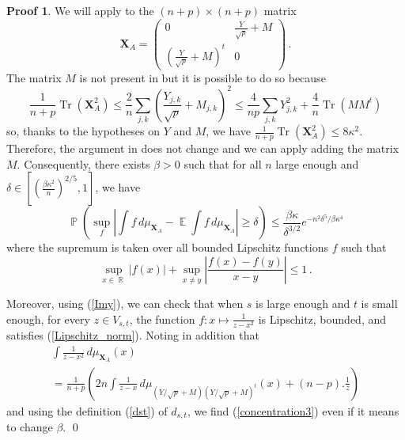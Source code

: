 \documentclass[11pt,a4paper]{article}
\DeclareMathOperator{\E}{\mathbb{E}}
\DeclareMathOperator{\R}{\mathbb{R}}
\DeclareMathOperator{\PR}{\mathbb{P}}
\DeclareMathOperator{\1}{\mathbf{1}}
\DeclareMathOperator{\Tr}{\mathrm{Tr}}
\theoremstyle{definition}
\newtheorem*{Proof}{Proof}
\begin{document}
\begin{Proof}
We will apply \cite[Theorem 1.3(b)]{GZ} to the $(n+p) \times (n+p)$ matrix
\begin{displaymath}
\mathbf{X}_A = \left( \begin{array}{c|c} 0 & \frac{Y}{\sqrt{p}} + M \\ \hline \left( \frac{Y}{\sqrt{p}} + M \right)^t & 0 \end{array} \right) \, .
\end{displaymath}
The matrix $M$ is not present in \cite{GZ} but it is possible to do so because
\begin{displaymath}
\frac{1}{n+p} \Tr(\mathbf{X}_A^2) \le \frac2n \sum_{j,k} \left( \frac{Y_{j,k}}{\sqrt{p}} + M_{j,k} \right)^2 \le \frac{4}{np} \sum_{j,k} Y_{j,k}^2 + \frac4n \Tr(MM^t)
\end{displaymath}
so, thanks to the hypotheses on $Y$ and $M$, we have $\frac{1}{n+p} \Tr(\mathbf{X}_A^2) \le 8 \kappa^2$. Therefore, the argument in \cite[p. 132]{GZ} does not change and we can apply \cite[Theorem 1.3(b)]{GZ} adding the matrix $M$. Consequently, there exists $\beta>0$ such that for all $n$ large enough and $\delta \in \left[ \left( \frac{\beta\kappa^2}{n} \right)^{2/5} , 1 \right]$, we have
\begin{displaymath}
\PR \left( \sup_f \left| \int f \, d\mu_{\mathbf{X}_A} - \E \int f \, d\mu_{\mathbf{X}_A} \right| \ge \delta \right) \le \frac{\beta\kappa}{\delta^{3/2}} e^{-n^2\delta^5/\beta\kappa^4}
\end{displaymath}
where the supremum is taken over all bounded Lipschitz functions $f$ such that
\begin{equation} \label{Lipschitz_norm}
\sup_{x \in \R} |f(x)| + \sup_{x \neq y} \left| \frac{f(x)-f(y)}{x-y} \right| \le 1 \, .
\end{equation}

Moreover, using (\ref{Imy}), we can check that when $s$ is large enough and $t$ is small enough, for every $z \in V_{s,t}$, the function $f : x \mapsto \frac{1}{z-x^2}$ is Lipschitz, bounded, and satisfies (\ref{Lipschitz_norm}). Noting in addition that
\begin{multline*}
\int \frac{1}{z-x^2} \, d\mu_{\mathbf{X}_A}(x) \\
= \frac{1}{n+p} \left( 2n \int \frac{1}{z-x} \, d\mu_{(Y/\sqrt{p}+M)(Y/\sqrt{p}+M)^t}(x) + (n-p).\frac1z \right)
\end{multline*}
and using the definition (\ref{dst}) of $d_{s,t}$, we find (\ref{concentration3}) even if it means to change $\beta$. \qed
\end{Proof}
\end{document}
